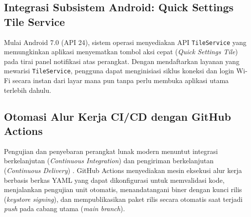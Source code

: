 \subsection{Integrasi Subsistem Android: Quick Settings Tile Service}
Mulai Android 7.0 (API 24), sistem operasi menyediakan API \texttt{TileService} yang memungkinkan aplikasi menyematkan tombol aksi cepat (\textit{Quick Settings Tile}) pada tirai panel notifikasi atas perangkat. Dengan mendaftarkan layanan yang mewarisi \texttt{TileService}, pengguna dapat menginisiasi siklus koneksi dan login Wi-Fi secara instan dari layar mana pun tanpa perlu membuka aplikasi utama terlebih dahulu.

\subsection{Otomasi Alur Kerja CI/CD dengan GitHub Actions}
Pengujian dan penyebaran perangkat lunak modern menuntut integrasi berkelanjutan (\textit{Continuous Integration}) dan pengiriman berkelanjutan (\textit{Continuous Delivery}) \cite{vokasi_capstone_eng}. GitHub Actions menyediakan mesin eksekusi alur kerja berbasis berkas YAML yang dapat dikonfigurasi untuk memvalidasi kode, menjalankan pengujian unit otomatis, menandatangani biner dengan kunci rilis (\textit{keystore signing}), dan mempublikasikan paket rilis secara otomatis saat terjadi \textit{push} pada cabang utama (\textit{main branch}).
